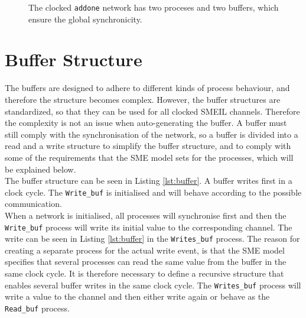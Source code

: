 \begin{figure}
\centering
{}
\caption{The clocked \texttt{addone} network has two proceses and two buffers, which ensure the global synchronicity.}
\label{fig:addone_clocked}
\end{figure}
\section{Buffer Structure}
The buffers are designed to adhere to different kinds of process behaviour, and therefore the structure becomes complex. However, the buffer structures are standardized, so that they can be used for all clocked SMEIL channels. Therefore the complexity is not an issue when auto-generating the buffer. A buffer must still comply with the synchronisation of the network, so a buffer is divided into a read and a write structure to simplify the buffer structure, and to comply with some of the requirements that the SME model sets for the processes, which will be explained below. \\

The buffer structure can be seen in Listing \ref{lst:buffer}.
A buffer writes first in a clock cycle. The \texttt{Write\_buf} is initialised and will behave according to the possible communication.\\

When a network is initialised, all processes will synchronise first and then the \texttt{Write\_buf} process will write its initial value to the corresponding channel. The write can be seen in Listing \ref{lst:buffer} in the \texttt{Writes\_buf} process. The reason for creating a separate process for the actual write event, is that the SME model specifies that several processes can read the same value from the buffer in the same clock cycle. It is therefore necessary to define a recursive structure that enables several buffer writes in the same clock cycle. The \texttt{Writes\_buf} process will write a value to the channel and then either write again or behave as the \texttt{Read\_buf} process.\\


